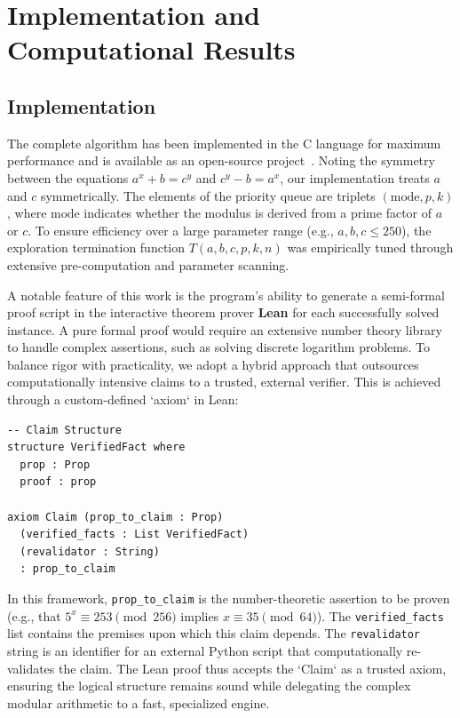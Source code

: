 \documentclass{article}
\begin{document}
\section{Implementation and Computational Results}
\label{sec:conclusion}

\subsection{Implementation}

The complete algorithm has been implemented in the C language for maximum performance and is available as an open-source project~\cite{cai2025diophantine}. Noting the symmetry between the equations $a^x+b=c^y$ and $c^y-b=a^x$, our implementation treats $a$ and $c$ symmetrically. The elements of the priority queue are triplets $(\text{mode}, p, k)$, where $\text{mode}$ indicates whether the modulus is derived from a prime factor of $a$ or $c$. To ensure efficiency over a large parameter range (e.g., $a, b, c \le 250$), the exploration termination function $T(a, b, c, p, k, n)$ was empirically tuned through extensive pre-computation and parameter scanning.

A notable feature of this work is the program's ability to generate a semi-formal proof script in the interactive theorem prover \textbf{Lean} for each successfully solved instance. A pure formal proof would require an extensive number theory library to handle complex assertions, such as solving discrete logarithm problems. To balance rigor with practicality, we adopt a hybrid approach that outsources computationally intensive claims to a trusted, external verifier. This is achieved through a custom-defined `axiom` in Lean:

\begin{verbatim}
-- Claim Structure
structure VerifiedFact where
  prop : Prop
  proof : prop

axiom Claim (prop_to_claim : Prop)
  (verified_facts : List VerifiedFact)
  (revalidator : String)
  : prop_to_claim
\end{verbatim}

In this framework, \texttt{prop\_to\_claim} is the number-theoretic assertion to be proven (e.g., that $5^x \equiv 253 \pmod{256}$ implies $x \equiv 35 \pmod{64}$). The \texttt{verified\_facts} list contains the premises upon which this claim depends. The \texttt{revalidator} string is an identifier for an external Python script that computationally re-validates the claim. The Lean proof thus accepts the `Claim` as a trusted axiom, ensuring the logical structure remains sound while delegating the complex modular arithmetic to a fast, specialized engine.
\end{document}
